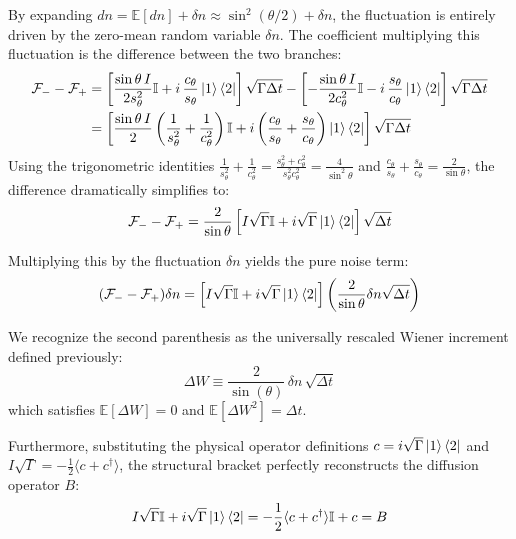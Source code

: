 \documentclass[a4paper,12pt]{article}
\begin{document}
By expanding $ dn = \mathbb{E}[dn] + \delta n \approx \sin^2(\theta/2) + \delta n $, the fluctuation is entirely driven by the zero-mean random variable $ \delta n $. The coefficient multiplying this fluctuation is the difference between the two branches:
\begin{align}
	\mathcal{F}_{-} - \mathcal{F}_{+} &= \left[ \frac{\sin\theta\, I}{2 s_{\theta}^{2}} \mathbb{I} + i\,\frac{c_{\theta}}{s_{\theta}} \ket{1}\bra{2} \right] \sqrt{\Gamma\Delta t} - \left[ -\frac{\sin\theta\, I}{2 c_{\theta}^{2}} \mathbb{I} - i\,\frac{s_{\theta}}{c_{\theta}} \ket{1}\bra{2} \right] \sqrt{\Gamma\Delta t} \notag \\
	&= \left[ \frac{\sin\theta\, I}{2} \left( \frac{1}{s_{\theta}^{2}} + \frac{1}{c_{\theta}^{2}} \right) \mathbb{I} + i \left( \frac{c_{\theta}}{s_{\theta}} + \frac{s_{\theta}}{c_{\theta}} \right) \ket{1}\bra{2} \right] \sqrt{\Gamma\Delta t}
\end{align}
Using the trigonometric identities $ \frac{1}{s_{\theta}^{2}} + \frac{1}{c_{\theta}^{2}} = \frac{s_{\theta}^{2} + c_{\theta}^{2}}{s_{\theta}^{2} c_{\theta}^{2}} = \frac{4}{\sin^2\theta} $ and $ \frac{c_{\theta}}{s_{\theta}} + \frac{s_{\theta}}{c_{\theta}} = \frac{2}{\sin\theta} $, the difference dramatically simplifies to:
\begin{equation}
	\mathcal{F}_{-} - \mathcal{F}_{+} = \frac{2}{\sin\theta} \left[ I \sqrt{\Gamma} \mathbb{I} + i\sqrt{\Gamma} \ket{1}\bra{2} \right] \sqrt{\Delta t}
\end{equation}

Multiplying this by the fluctuation $ \delta n $ yields the pure noise term:
\begin{equation}
	(\mathcal{F}_{-} - \mathcal{F}_{+}) \delta n = \left[ I \sqrt{\Gamma} \mathbb{I} + i\sqrt{\Gamma} \ket{1}\bra{2} \right] \left( \frac{2}{\sin\theta} \delta n \sqrt{\Delta t} \right)
\end{equation}

We recognize the second parenthesis as the universally rescaled Wiener increment defined previously:
\begin{equation}
	\Delta W \equiv \frac{2}{\sin(\theta)}\,\delta n\,\sqrt{\Delta t}
\end{equation}
which satisfies $ \mathbb{E}[\Delta W] = 0 $ and $ \mathbb{E}[\Delta W^2] = \Delta t $. 

Furthermore, substituting the physical operator definitions $ c = i\sqrt{\Gamma}\ket{1}\bra{2} $ and $ I\sqrt{\Gamma} = -\frac{1}{2}\langle c + c^\dagger \rangle $, the structural bracket perfectly reconstructs the diffusion operator $ B $:
\begin{equation}
	I \sqrt{\Gamma} \mathbb{I} + i\sqrt{\Gamma} \ket{1}\bra{2} = -\frac{1}{2}\langle c + c^\dagger \rangle \mathbb{I} + c = B
\end{equation}
\end{document}
